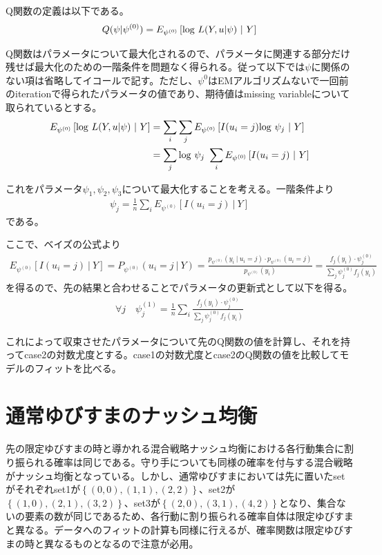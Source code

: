 \documentclass{jsarticle}
\begin{document}
Q関数の定義は以下である。
\begin{align*}
	Q(\psi | \psi^{(0)}) = E_{\psi^{(0)}}\left[ {\rm log}\ L(Y, u | \psi)\ |\ Y \right]
\end{align*}

Q関数はパラメータについて最大化されるので、パラメータに関連する部分だけ残せば最大化のための一階条件を問題なく得られる。従って以下では$\psi$に関係のない項は省略してイコールで記す。ただし、$\psi^{0}$はEMアルゴリズムないで一回前のiterationで得られたパラメータの値であり、期待値はmissing variableについて取られているとする。
\begin{align}
	E_{\psi^{(0)}}\left[ {\rm log}\ L(Y, u | \psi)\ |\ Y \right] &= \sum_i \sum_j E_{\psi^{(0)}}\left[ I(u_i = j) {\rm log}\ \psi_j\ |\ Y \right]\nonumber \\
	&= \sum_j {\rm log}\ \psi_j\ \sum_i E_{\psi^{(0)}}\left[ I(u_i = j)\ |\ Y \right]
\end{align}

これをパラメータ$\psi_1, \psi_2, \psi_3$について最大化することを考える。一階条件より
\begin{align}
	\psi_j = \frac{1}{n} \sum_i E_{\psi^{(0)}}\left[ I(u_i = j)\ |\ Y \right]
\end{align}
である。

ここで、ベイズの公式より
\begin{align*}
	E_{\psi^{(0)}}\left[ I(u_i = j)\ |\ Y \right] = P_{\psi^{(0)}}( u_i = j\ |\ Y ) = \frac{p_{\psi^{(0)}} (y_i\ |\ u_i = j) \cdot p_{\psi^{(0)}} (u_i = j)}{p_{\psi^{(0)}} (y_i)} = \frac{f_j(y_i) \cdot \psi_j^{(0)}}{\sum_j \psi_j^{(0)} f_j(y_i)}
\end{align*}
を得るので、先の結果と合わせることでパラメータの更新式として以下を得る。
\begin{align}
	\forall j \quad \psi_j^{(1)} = \frac{1}{n} \sum_i \frac{f_j(y_i) \cdot \psi_j^{(0)}}{\sum_j \psi_j^{(0)} f_j(y_i)}
\end{align}

これによって収束させたパラメータについて先のQ関数の値を計算し、それを持ってcase2の対数尤度とする。case1の対数尤度とcase2のQ関数の値を比較してモデルのフィットを比べる。

\section{通常ゆびすまのナッシュ均衡}
先の限定ゆびすまの時と導かれる混合戦略ナッシュ均衡における各行動集合に割り振られる確率は同じである。守り手についても同様の確率を付与する混合戦略がナッシュ均衡となっている。しかし、通常ゆびすまにおいては先に置いたsetがそれぞれset1が$\left\{ (0,0), (1,1), (2,2)\right\}$、set2が$\left\{ (1,0), (2,1), (3,2)\right\}$、set3が$\left\{ (2,0), (3,1), (4,2)\right\}$となり、集合ないの要素の数が同じであるため、各行動に割り振られる確率自体は限定ゆびすまと異なる。データへのフィットの計算も同様に行えるが、確率関数は限定ゆびすまの時と異なるものとなるので注意が必用。
\end{document}
